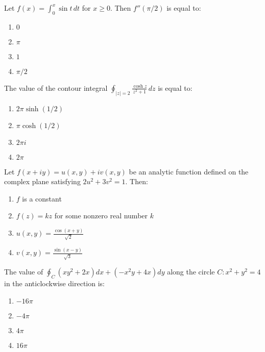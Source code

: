 \item Let $f(x) = \int_0^x \sin t \, dt$ for $x \geq 0$. Then $f''(\pi/2)$ is equal to:
\begin{enumerate}
    \item $0$
    \item $\pi$
    \item $1$
    \item $\pi/2$
\end{enumerate}

\item The value of the contour integral $\oint_{|z|=2} \frac{\cosh z}{z^2 + 1} \, dz$ is equal to:
\begin{enumerate}
    \item $2\pi \sinh (1/2)$
    \item $\pi \cosh (1/2)$
    \item $2\pi i$
    \item $2\pi$
\end{enumerate}
\item Let $f(x+iy) = u(x,y) + iv(x,y)$ be an analytic function defined on the complex plane satisfying $2u^2 + 3v^2 = 1$. Then:
\begin{enumerate}
    \item $f$ is a constant
    \item $f(z) = kz$ for some nonzero real number $k$
    \item $u(x,y) = \frac{\cos(x+y)}{\sqrt{2}}$
    \item $v(x,y) = \frac{\sin(x-y)}{\sqrt{3}}$
\end{enumerate}

\item The value of $\oint_C (xy^2 + 2x) dx + (-x^2 y + 4x) dy$ along the circle $C: x^2 + y^2 = 4$ in the anticlockwise direction is:
\begin{enumerate}
    \item $-16\pi$
    \item $-4\pi$
    \item $4\pi$
    \item $16\pi$
\end{enumerate}


